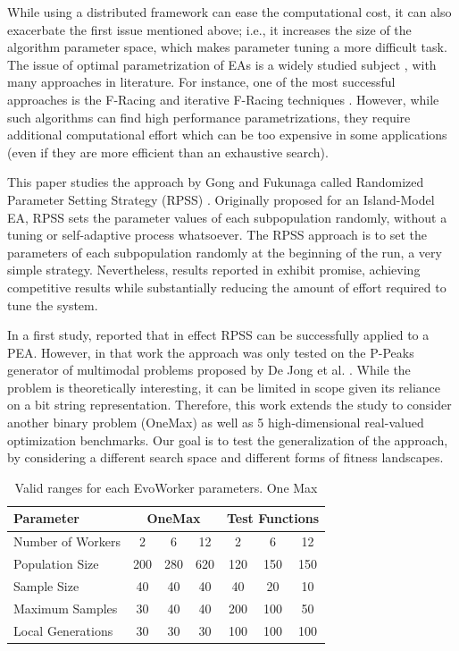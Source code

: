 \documentclass{llncs}
\begin{document}
While using a distributed framework can ease the computational cost, it can also exacerbate the first issue mentioned above;
i.e., it increases the size of the algorithm parameter space, which makes parameter tuning a more difficult task.
The issue of optimal parametrization of EAs is a widely studied subject \cite{de2007parameter}, 
with many approaches in literature. For instance, one of the most successful approaches 
is the F-Racing and iterative F-Racing techniques \cite{lopez2011irace}. 
However, while such algorithms can find high performance parametrizations, 
they require additional computational effort which can be too expensive in some applications
(even if they are more efficient than an exhaustive search).

This paper studies the approach by Gong and Fukunaga called Randomized Parameter Setting Strategy (RPSS) \cite{fuku1,fuku2}.
Originally proposed for an Island-Model EA, RPSS sets the parameter values of each subpopulation randomly, 
without a tuning or self-adaptive process whatsoever. The RPSS approach is to set the parameters 
of each subpopulation randomly at the beginning of the run, a very simple strategy.
Nevertheless, results reported in \cite{fuku1,fuku2} exhibit promise, achieving competitive results 
while substantially reducing the amount of effort required to tune the system.

In a first study, \cite{garcia2014randomized} reported that in effect RPSS 
can be successfully applied to a PEA. However, in that work the
approach was only tested on the P-Peaks generator of multimodal problems proposed by De Jong et al. \cite{Jong:PS97}.
While the problem is theoretically interesting, it can be limited in scope given its reliance on a bit string representation.
Therefore, this work extends the study to consider another binary problem (OneMax) as well as 
5 high-dimensional real-valued optimization benchmarks. Our goal is to test the generalization of 
the approach, by considering a different search space and different forms of fitness landscapes.


\begin{table}[!t]
\caption{Valid ranges for each EvoWorker parameters. One Max}
\label{tab:params}
\centering
\begin{tabular}{|l|c|c|c|c|c|c| }
\hline
\textbf{Parameter} & \multicolumn{3}{|c|}{OneMax} & \multicolumn{3}{|c|}{Test Functions} \\
\hline
Number of Workers & 2 & 6 & 12 & 2 & 6 & 12\\
\hline
\hline
Population Size & 200 & 280 & 620 & 120 & 150 & 150\\
\hline
Sample Size & 40 & 40 & 40 & 40 & 20 & 10\\
\hline
Maximum Samples & 30 & 40 & 40 & 200 & 100 & 50\\
\hline
Local Generations & 30 & 30 & 30 & 100 & 100 & 100\\
\hline
\end{tabular}
\end{table}
\end{document}
